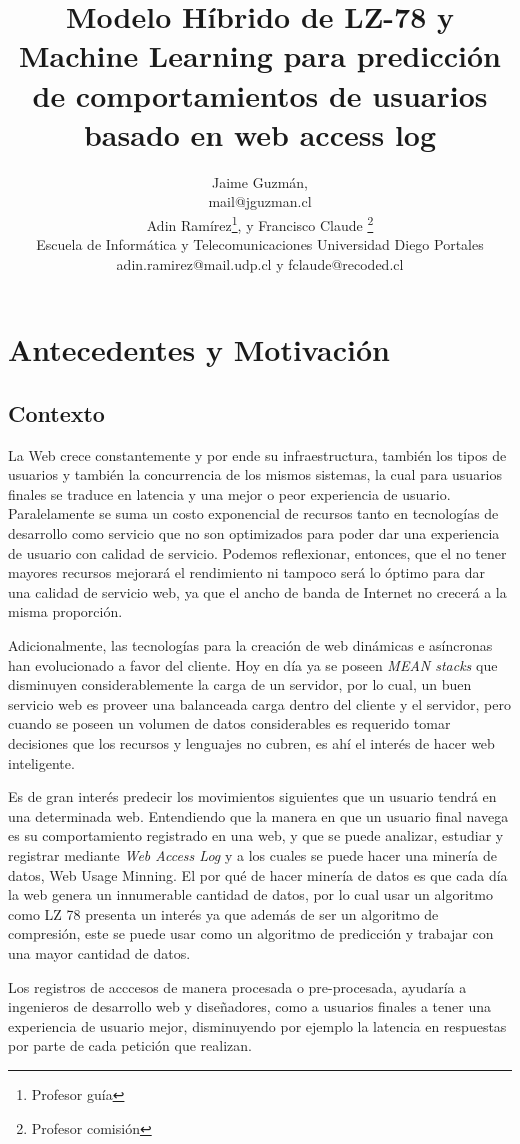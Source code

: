 \documentclass{udparticle}
\title{ Modelo Híbrido de LZ-78 y Machine Learning para predicción de comportamientos de usuarios basado en web access log }
\author{ Jaime Guzmán, \\ {\small mail@jguzman.cl}\protect\\[5pt]%
	{\small Adin Ramírez\thanks{Profesor guía}, y Francisco Claude \thanks{Profesor comisión}} \\
		{\small Escuela de Informática y Telecomunicaciones Universidad Diego Portales} \\
		{\small adin.ramirez@mail.udp.cl y fclaude@recoded.cl }\protect\\[5pt]%
}
\begin{document}
\maketitle
\section{Antecedentes y Motivación}

\subsection{Contexto}

  La Web crece constantemente y por ende su infraestructura, también los tipos de usuarios y  también la concurrencia de los mismos sistemas, la cual para usuarios finales se traduce en latencia y una mejor o peor experiencia de usuario. 
  Paralelamente se suma un costo exponencial de recursos tanto en tecnologías de desarrollo como servicio que no son optimizados para poder dar una experiencia de usuario con calidad de servicio. Podemos reflexionar, entonces, que el no tener mayores recursos mejorará el rendimiento ni tampoco será lo óptimo para dar una calidad de servicio web, ya que el ancho de banda de Internet no crecerá a la misma proporción.
   
  Adicionalmente, las tecnologías para la creación de web dinámicas e asíncronas han evolucionado a favor del cliente.
  Hoy en día ya se poseen \emph{MEAN stacks} que disminuyen considerablemente la carga de un servidor, por lo cual, un buen servicio web es proveer una balanceada carga dentro del cliente y el servidor, pero cuando se poseen un volumen de datos considerables es requerido tomar decisiones que los recursos y lenguajes no cubren, es ahí el interés de hacer  web inteligente.

  Es de gran interés predecir los movimientos siguientes que un usuario tendrá en una determinada web.
  Entendiendo que la manera en que un usuario final navega es su comportamiento registrado en una web, y que se puede analizar, estudiar y registrar mediante \emph{Web Access Log} y a los cuales se puede hacer una minería de datos, Web Usage Minning. El por qué de hacer minería de datos es que cada día la web genera un innumerable cantidad de datos, por lo cual usar un algoritmo como LZ 78 presenta un interés ya que además de ser un algoritmo de compresión, este se puede usar como un algoritmo de predicción y trabajar con una mayor cantidad de datos.
  
  Los registros de acccesos de manera procesada o pre-procesada, ayudaría a ingenieros de desarrollo web y diseñadores, como a  usuarios finales a tener una experiencia de usuario mejor, disminuyendo por ejemplo la latencia en respuestas por parte de cada petición que realizan.
  
\end{document}

